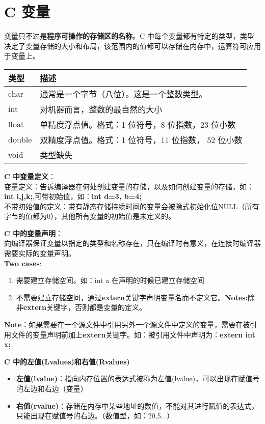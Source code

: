 \documentclass[UTF8]{ctexart}
\begin{document}
	\clearpage
	\section{C 变量}
	变量只不过是\textbf{程序可操作的存储区的名称}。C 中每个变量都有特定的类型，类型决定了变量存储的大小和布局，该范围内的值都可以存储在内存中，运算符可应用于变量上。
	\begin{tabular*}{\linewidth}{l|l}
		\toprule
		类型 & 描述 \\
		\midrule
		char & 通常是一个字节（八位）。这是一个整数类型。\\
		int & 对机器而言，整数的最自然的大小\\
		float & 单精度浮点值。格式：1 位符号，8 位指数，23 位小数\\
		double & 双精度浮点值。格式：1 位符号，11 位指数， 52 位小数\\
		void & 类型缺失\\
		\bottomrule
	\end{tabular*}
	\textbf{C 中变量定义}：\\变量定义：告诉编译器在何处创建变量的存储，以及如何创建变量的存储，如：\textbf{int i,j,k;},可带初始值，如：\textbf{int d=3, b=4;}\\不带初始值的定义：带有静态存储持续时间的变量会被隐式初始化位NULL（所有字节的值都为0），其他所有变量的初始值是未定义的。
	
	\textbf{C 中的变量声明}：\\向编译器保证变量以指定的类型和名称存在，只在编译时有意义，在连接时编译器需要实际的变量声明。\\ \textbf{Two cases}: \begin{enumerate}
		\item 需要建立存储空间。如：int a 在声明的时候已建立存储空间
		\item 不需要建立存储空间，通过\textbf{extern}关键字声明变量名而不定义它。\textbf{Notes:}除非\textbf{extern}关键字，否则都是变量的定义。
	\end{enumerate}
	\textbf{Note}：如果需要在一个源文件中引用另外一个源文件中定义的变量，需要在被引用文件的变量声明前加上\textbf{extern}关键字。如：被引用文件中声明为：\textbf{extern int x;}
	
	\textbf{C 中的左值(Lvalues)和右值(Rvalues)}\begin{itemize}
		\item \textbf{左值(lvalue)}：指向内存位置的表达式被称为左值(lvalue)，可以出现在赋值号的左边和右边（变量）
		\item \textbf{右值(rvalue)}：存储在内存中某些地址的数值，不能对其进行赋值的表达式，只能出现在赋值号的右边。（数值型，如：20,5...）
	\end{itemize}
\end{document}
